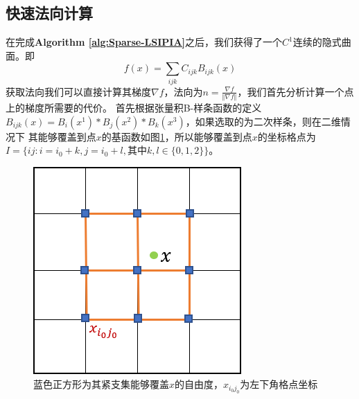 \subsection{快速法向计算}
在完成\textbf{Algorithm \ref{alg:Sparse-LSIPIA}}之后，我们获得了一个$C^1$连续的隐式曲面。即
\begin{equation}
    f(x) = \sum_{ijk} C_{ijk}B_{ijk}(x)
\end{equation}
获取法向我们可以直接计算其梯度$\nabla f$，法向为$n = \frac{\nabla f}{\Vert \nabla f\Vert}$，我们首先分析计算一个点上的梯度所需要的代价。
首先根据张量积B-样条函数的定义$B_{ijk}(x) = B_i(x^1) * B_j(x^2) * B_k(x^3)$，如果选取的为二次样条，则在二维情况下
其能够覆盖到点$x$的基函数如图\ref{fig:2D basis}，所以能够覆盖到点$x$的坐标格点为$I = \{ij: i = i_0 + k, j = i_0 + l, \text{其中}k, l \in \{0,1,2\}\}$。
\begin{figure}[htbp]
    \centering
    \includegraphics[scale=1.0]{./images/image9.png}
    \caption[自由度图例]{蓝色正方形为其紧支集能够覆盖$x$的自由度，$x_{i_0j_0}$为左下角格点坐标}
    \label{fig:2D basis}
\end{figure}


